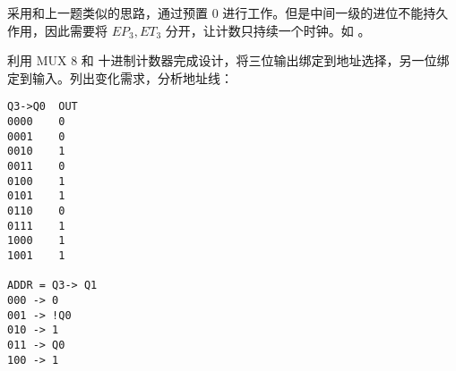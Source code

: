 \documentclass[lang=cn,11pt,a4paper,cite=authoryear]{elegantpaper}
\begin{document}

采用和上一题类似的思路，通过预置 0 进行工作。但是中间一级的进位不能持久作用，因此需要将 \(EP_3, ET_3\) 分开，让计数只持续一个时钟。如  。



利用 MUX 8 和 十进制计数器完成设计，将三位输出绑定到地址选择，另一位绑定到输入。列出变化需求，分析地址线： 

\begin{lstlisting}
Q3->Q0  OUT
0000    0
0001    0
0010    1
0011    0
0100    1
0101    1
0110    0
0111    1
1000    1
1001    1

ADDR = Q3-> Q1 
000 -> 0 
001 -> !Q0 
010 -> 1
011 -> Q0 
100 -> 1
\end{lstlisting}

\end{document}
